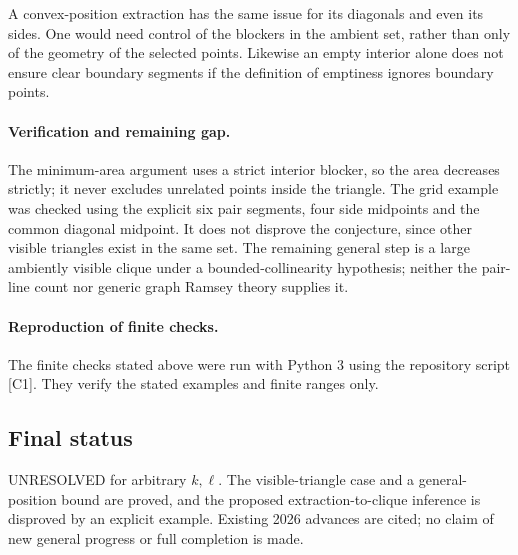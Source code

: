 \documentclass[11pt,a4paper]{article}
\begin{document}
A convex-position extraction has the same issue for its diagonals
and even its sides. One would need control of the blockers in the
ambient set, rather than only of the geometry of the selected points.
Likewise an empty interior alone does not ensure clear boundary
segments if the definition of emptiness ignores boundary points.

\paragraph{Verification and remaining gap.}
The minimum-area argument uses a strict interior blocker, so the
area decreases strictly; it never excludes unrelated points inside
the triangle. The grid example was checked using the explicit six
pair segments, four side midpoints and the common diagonal midpoint.
It does not disprove the conjecture, since other visible triangles
exist in the same set. The remaining general step is a large
ambiently visible clique under a bounded-collinearity hypothesis;
neither the pair-line count nor generic graph Ramsey theory supplies it.

\paragraph{Reproduction of finite checks.}
The finite checks stated above were run with Python 3 using the repository
script [C1]. They verify the stated examples and finite ranges only.

\subsection{Final status}
UNRESOLVED for arbitrary $k,\ell$. The visible-triangle case and a
general-position bound are proved, and the proposed extraction-to-clique
inference is disproved by an explicit example. Existing 2026 advances
are cited; no claim of new general progress or full completion is made.
\end{document}
